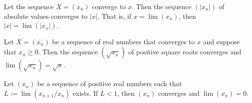 \begin{theorem}
	Let the sequence $X=(x_n)$ converge to $x$. Then the sequence $(|x_n|)$ of absolute values converges to $|x|$. That is, if $x=\lim (x_n)$, then $|x|=\lim (|x_n|)$.
\end{theorem}

\begin{theorem}
	Let $X=(x_n)$ be a sequence of real numbers that converges to $x$ and suppose that $x_n \geq 0$. Then the sequence $(\sqrt{x_n})$ of positive square roots converges and $\lim (\sqrt{x_n})=\sqrt{x}$.
\end{theorem}

\begin{theorem}
	Let $(x_n)$ be a sequence of positive real numbers such that $L := \lim (x_{n+1}/x_n)$ exists. If $L <1$, then $(x_n)$ converges and $\lim (x_n)=0$.
\end{theorem}
